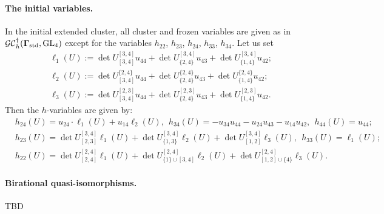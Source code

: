  \paragraph{The initial variables.} In the initial extended cluster, all cluster and frozen variables are given as in $\mathcal{GC}_h^{\dagger}(\mathbf{\Gamma}_{\text{std}},\operatorname{GL}_4)$ except for the variables $h_{22}$, $h_{23}$, $h_{24}$, $h_{33}$, $h_{34}$. Let us set
\begin{align}
    &\ell_1(U) := \det U^{[3,4]}_{[3,4]}u_{44} +\det U_{\{2,4\}}^{[3,4]} u_{43}+ \det U^{[3,4]}_{\{1,4\}} u_{42};\\
    &\ell_2(U) := \det U_{[3,4]}^{\{2,4\}}u_{44} +\det U_{\{2,4\}}^{\{2,4\}} u_{43}+ \det U^{\{2,4\}}_{\{1,4\}} u_{42};\\
    &\ell_3(U) := \det U_{[3,4]}^{[2,3]}u_{44} +\det U_{\{2,4\}}^{[2,3]} u_{43}+ \det U^{[2,3]}_{\{1,4\}} u_{42}.
\end{align}
Then the $h$-variables are given by:
\begin{align}
    &h_{24}(U) = u_{24}\cdot \ell_1(U) + u_{14}\ell_2(U), \ \ h_{34}(U) = -u_{34}u_{44} - u_{24}u_{43} - u_{14}u_{42}, \ \ h_{44}(U) = u_{44}; \\
    &h_{23}(U) = \det U^{[3,4]}_{[2,3]}\ell_1(U) + \det U^{[3,4]}_{\{1,3\}}\ell_2(U) + \det U^{[3,4]}_{[1,2]}\ell_3(U), \ \ h_{33}(U) = \ell_1(U);\\
    &h_{22}(U) = \det U^{[2,4]}_{[2,4]}\ell_1(U) + \det U_{\{1\}\cup[3,4]}^{[2,4]}\ell_2(U) + \det U^{[2,4]}_{[1,2]\cup\{4\}}\ell_3(U).
\end{align}

 \paragraph{Birational quasi-isomorphisms.} TBD